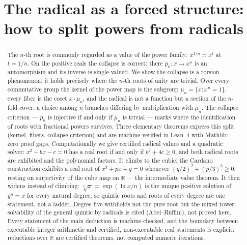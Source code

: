 \documentclass[submission,noinfoline]{jsfds}
\begin{document}
\begin{frontmatter}

\title{The radical as a forced structure:
how to split powers from radicals}

\begin{aug}
\end{aug}

\begin{abstract}
The $n$-th root is commonly regarded as a value of the power family:
$x^{1/n}=x^t$ at $t=1/n$. On the positive reals the collapse is
correct: there $p_n\colon x\mapsto x^n$ is an automorphism and its
inverse is single-valued. We show the collapse is a torsion phenomenon:
it holds precisely where the $n$-th roots of unity are trivial. Over
every commutative group the kernel of the power map is the subgroup
$\mu_n=\{x:x^n=1\}$, every fiber is the coset $x\cdot\mu_n$, and the
radical is not a function but a section of the $n$-fold cover: a choice
among $n$ branches differing by multiplication with $\mu_n$. The
collapse criterion --- $p_n$ is injective if and only if $\mu_n$ is
trivial --- marks where the identification of roots with fractional
powers survives. Three elementary theorems express this split (kernel,
fibers, collapse criterion) and are machine-verified in Lean~4 with
Mathlib: zero proof gaps. Computationally we give certified radical
values and a quadratic solver: $x^2-bx-c=0$ has a real root if and only
if $b^2+4c\ge0$, and both radical roots are exhibited and the polynomial
factors. It climbs to the cubic: the Cardano construction exhibits a
real root of $x^3+px+q=0$ whenever $(q/2)^2+(p/3)^3\ge0$, resting on
surjectivity of the cube map on $\mathbb R$ --- the intermediate value
theorem. It then widens instead of climbing: $\sqrt[n]{x}=\exp(\ln x/n)$
is the unique positive solution of $y^n=x$ for every natural degree, so
quintic roots and roots of every degree are one statement, not a
ladder. Degree five withholds not the pure root but the mixed tower;
solvability of the general quintic by radicals is cited (Abel--Ruffini),
not proved here. Every statement of the main deduction is
machine-checked, and the boundary between executable integer arithmetic
and certified, non-executable real statements is explicit: reductions
over $\mathbb R$ are certified theorems, not computed numeric
iterations.
\end{abstract}

\begin{keywords}
\end{keywords}

\begin{AMSclass}
\end{AMSclass}
\end{frontmatter}
\end{document}
